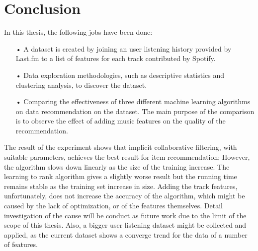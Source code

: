 \chapter{Conclusion} %

\label{Chapter6}

In this thesis, the following jobs have been done:

\begin{itemize}
	\item[•] A dataset is created by joining an user listening history provided by Last.fm to a list of features for each track contributed by Spotify. 
	\item[•] Data exploration methodologies, such as descriptive statistics and clustering analysis, to discover the dataset.
	\item[•] Comparing the effectiveness of three different machine learning algorithms on data recommendation on the dataset. The main purpose of the comparison is to observe the effect of adding music features on the quality of the recommendation. 
\end{itemize}

The result of the experiment shows that implicit collaborative filtering, with suitable  parameters, achieves the best result for item recommendation; However, the algorithm slows down linearly as the size of the training increase. The learning to rank algorithm gives a slightly worse result but the running time remains stable as the training set increase in size. Adding the track features, unfortunately, does not increase the accuracy of the algorithm, which might be caused by the lack of optimization, or of the features themselves. Detail investigation of the cause will be conduct as future work due to the limit of the scope of this thesis. Also, a bigger user listening dataset might be collected and applied, as the current dataset shows a converge trend for the data of a number of features.